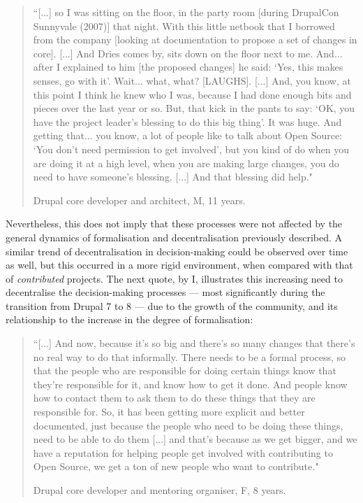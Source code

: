\begin{quotation}
``[...] so I was sitting on the floor, in the party room [during DrupalCon Sunnyvale (2007)] that night. With this little netbook that I borrowed from the company [looking at documentation to propose a set of changes in core]. [...] And Dries comes by, sits down on the floor next to me. And... after I explained to him [the proposed changes] he said:  `Yes, this makes senses, go with it'. Wait... what, what? [LAUGHS]. [...] And, you know, at this point I think he knew who I was, because I had done enough bits and pieces over the last year or so. But, that kick in the pants to say: `OK, you have the project leader's blessing to do this big thing'. It was huge. And getting that... you know, a lot of people like to talk about Open Source: `You don't need permission to get involved', but you kind of do when you are doing it at a high level, when you are making large changes, you do need to have someone's blessing. [...] And that blessing did help."
\begin{flushright}\footnotesize{Drupal core developer and architect, M, 11 years.}\end{flushright}
\end{quotation}

Nevertheless, this does not imply that these processes were not affected by the general dynamics of formalisation and decentralisation previously described. A similar trend of decentralisation in decision-making could be observed over time as well, but this occurred in a more rigid environment, when compared with that of \textit{contributed} projects. The next quote, by I, illustrates this increasing need to decentralise the decision-making processes --- most significantly during the transition from Drupal 7 to 8 --- due to the growth of the community, and its relationship to the increase in the degree of formalisation:

\begin{quotation}
``[...] And now, because it's so big and there's so many changes that there's no real way to do that informally. There needs to be a formal process, so that the people who are responsible for doing certain things know that they're responsible for it, and know how to get it done. And people know how to contact them to ask them to do these things that they are responsible for. So, it has been getting more explicit and better documented, just because the people who need to be doing these things, need to be able to do them [...] and that's because as we get bigger, and we have a reputation for helping people get involved with contributing to Open Source, we get a ton of new people who want to contribute."
\begin{flushright}\footnotesize{Drupal core developer and mentoring organiser, F, 8 years.}\end{flushright}
\end{quotation}

